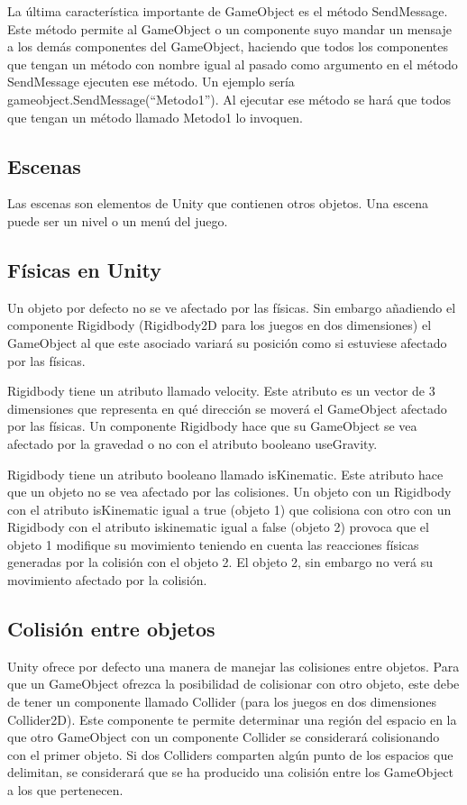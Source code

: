 La última característica importante de GameObject es el método SendMessage. Este método permite al GameObject o un componente suyo mandar un mensaje a los demás componentes del GameObject, haciendo que todos los componentes que tengan un método con nombre igual al pasado como argumento en el método SendMessage ejecuten ese método. Un ejemplo sería gameobject.SendMessage(“Metodo1”). Al ejecutar ese método se hará que todos que tengan un método llamado Metodo1 lo invoquen.

\subsection{Escenas}
Las escenas son elementos de Unity que contienen otros objetos. Una escena puede ser un nivel o un menú del juego.

\subsection{Físicas en Unity}
Un objeto por defecto no se ve afectado por las físicas. Sin embargo añadiendo el componente Rigidbody (Rigidbody2D para los juegos en dos dimensiones) el GameObject al que este asociado variará su posición como si estuviese afectado por las físicas.

Rigidbody tiene un atributo llamado velocity. Este atributo es un vector de 3 dimensiones que representa en qué dirección se moverá el GameObject afectado por las físicas. Un componente Rigidbody hace que su GameObject se vea afectado por la gravedad o no con el atributo booleano useGravity.

Rigidbody tiene un atributo booleano llamado isKinematic. Este atributo hace que un objeto no se vea afectado por las colisiones. Un objeto con un Rigidbody con el atributo isKinematic igual a true (objeto 1) que colisiona con otro con un Rigidbody con el atributo iskinematic igual a false (objeto 2) provoca que el objeto 1 modifique su movimiento teniendo en cuenta las reacciones físicas generadas por la colisión con el objeto 2. El objeto 2, sin embargo no verá su movimiento afectado por la colisión.

\subsection{Colisión entre objetos}
Unity ofrece por defecto una manera de manejar las colisiones entre objetos. Para que un GameObject ofrezca la posibilidad de colisionar con otro objeto, este debe de tener un componente llamado Collider (para los juegos en dos dimensiones Collider2D). Este componente te permite determinar una región del espacio en la que otro GameObject con un componente Collider se considerará colisionando con el primer objeto. Si dos Colliders comparten algún punto de los espacios que delimitan, se considerará que se ha producido una colisión entre los GameObject a los que pertenecen. 


